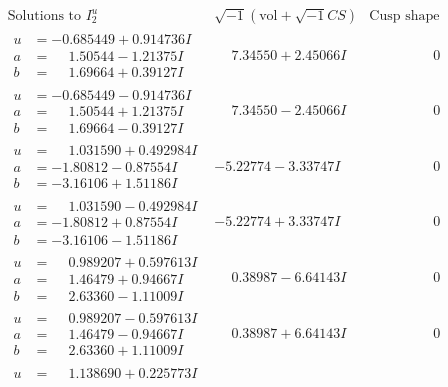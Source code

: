 \documentclass[1p]{elsarticle_modified}
\theoremstyle{definition}
\newcommand{\I}{\sqrt{-1}}
\begin{document}
$$\begin{array}{c|c|c}
\text{Solutions to }I^u_{2}& \I (\text{vol} + \sqrt{-1}CS) & \text{Cusp shape}\\
 \hline 
\begin{aligned}
u &= -0.685449 + 0.914736 I \\
a &= \phantom{-}1.50544 - 1.21375 I \\
b &= \phantom{-}1.69664 + 0.39127 I\end{aligned}
 & \phantom{-}7.34550 + 2.45066 I & \phantom{-0.000000 } 0 \\ \hline\begin{aligned}
u &= -0.685449 - 0.914736 I \\
a &= \phantom{-}1.50544 + 1.21375 I \\
b &= \phantom{-}1.69664 - 0.39127 I\end{aligned}
 & \phantom{-}7.34550 - 2.45066 I & \phantom{-0.000000 } 0 \\ \hline\begin{aligned}
u &= \phantom{-}1.031590 + 0.492984 I \\
a &= -1.80812 - 0.87554 I \\
b &= -3.16106 + 1.51186 I\end{aligned}
 & -5.22774 - 3.33747 I & \phantom{-0.000000 } 0 \\ \hline\begin{aligned}
u &= \phantom{-}1.031590 - 0.492984 I \\
a &= -1.80812 + 0.87554 I \\
b &= -3.16106 - 1.51186 I\end{aligned}
 & -5.22774 + 3.33747 I & \phantom{-0.000000 } 0 \\ \hline\begin{aligned}
u &= \phantom{-}0.989207 + 0.597613 I \\
a &= \phantom{-}1.46479 + 0.94667 I \\
b &= \phantom{-}2.63360 - 1.11009 I\end{aligned}
 & \phantom{-}0.38987 - 6.64143 I & \phantom{-0.000000 } 0 \\ \hline\begin{aligned}
u &= \phantom{-}0.989207 - 0.597613 I \\
a &= \phantom{-}1.46479 - 0.94667 I \\
b &= \phantom{-}2.63360 + 1.11009 I\end{aligned}
 & \phantom{-}0.38987 + 6.64143 I & \phantom{-0.000000 } 0 \\ \hline\begin{aligned}
u &= \phantom{-}1.138690 + 0.225773 I \\

\end{aligned}
\end{array}$$
\end{document}
